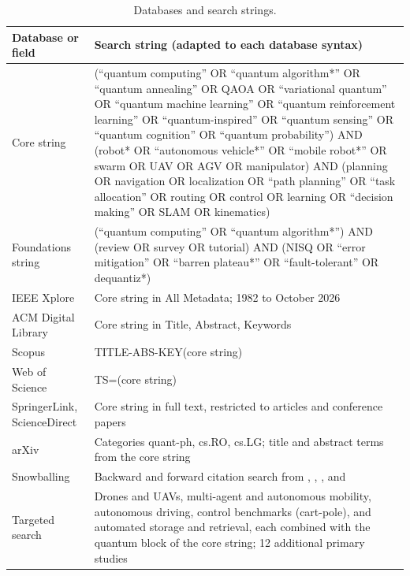 \documentclass[acmsmall,screen,review]{acmart}
\begin{document}
\begin{table}[h]
\caption{Databases and search strings.}
\label{tab:search}
\footnotesize
\begin{tabular}{@{}>{\raggedright\arraybackslash}p{0.220\dimexpr\linewidth-4\tabcolsep\relax}>{\raggedright\arraybackslash}p{0.780\dimexpr\linewidth-4\tabcolsep\relax}@{}}
\toprule
\textbf{Database or field} & \textbf{Search string (adapted to each database syntax)} \\ \midrule
Core string & (``quantum computing'' OR ``quantum algorithm*'' OR ``quantum annealing'' OR QAOA OR ``variational quantum'' OR ``quantum machine learning'' OR ``quantum reinforcement learning'' OR ``quantum-inspired'' OR ``quantum sensing'' OR ``quantum cognition'' OR ``quantum probability'') AND (robot* OR ``autonomous vehicle*'' OR ``mobile robot*'' OR swarm OR UAV OR AGV OR manipulator) AND (planning OR navigation OR localization OR ``path planning'' OR ``task allocation'' OR routing OR control OR learning OR ``decision making'' OR SLAM OR kinematics) \\
Foundations string & (``quantum computing'' OR ``quantum algorithm*'') AND (review OR survey OR tutorial) AND (NISQ OR ``error mitigation'' OR ``barren plateau*'' OR ``fault-tolerant'' OR dequantiz*) \\
IEEE Xplore & Core string in All Metadata; 1982 to October 2026 \\
ACM Digital Library & Core string in Title, Abstract, Keywords \\
Scopus & TITLE-ABS-KEY(core string) \\
Web of Science & TS=(core string) \\
SpringerLink, ScienceDirect & Core string in full text, restricted to articles and conference papers \\
arXiv & Categories quant-ph, cs.RO, cs.LG; title and abstract terms from the core string \\
Snowballing & Backward and forward citation search from \citet{Petschnigg2019}, \citet{Yan2024}, \citet{Meyer2022}, and \citet{Tandon2017} \\
Targeted search & Drones and UAVs, multi-agent and autonomous mobility, autonomous driving, control benchmarks (cart-pole), and automated storage and retrieval, each combined with the quantum block of the core string; 12 additional primary studies \\
\bottomrule
\end{tabular}
\end{table}
\end{document}
